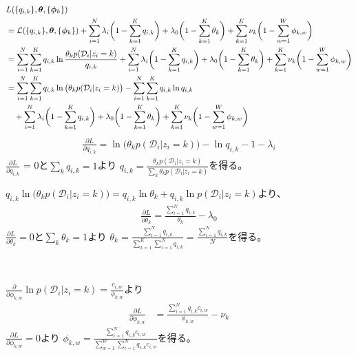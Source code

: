 \documentclass[aspectratio=169,unicode,dvipdfmx,14pt]{beamer}
\begin{document}
\begin{frame}
\FontMath
\begin{align}
& L(\{q_{i,k}\},\bm{\theta}, \{ \bm{\phi}_k \} ) 
\notag \\ &
= \mathcal{L}(\{q_{i,k}\},\bm{\theta},\{ \bm{\phi}_k \})
+ \sum_{i=1}^N \lambda_i \bigg(1 - \sum_{k=1}^K q_{i,k}\bigg)
+ \lambda_0 \bigg( 1 - \sum_{k=1}^K \theta_k \bigg)
+ \sum_{k=1}^K \nu_k \bigg( 1 - \sum_{w=1}^W \phi_{k,w} \bigg)
\notag \\ &
= \sum_{i=1}^N \sum_{k=1}^K q_{i,k} \ln\frac{\theta_k p(\mathcal{D}_i | z_i = k)}{q_{i,k}}
+ \sum_{i=1}^N \lambda_i \bigg(1 - \sum_{k=1}^K q_{i,k}\bigg)
+ \lambda_0 \bigg( 1 - \sum_{k=1}^K \theta_k \bigg)
+ \sum_{k=1}^K \nu_k \bigg( 1 - \sum_{w=1}^W \phi_{k,w} \bigg)
\notag \\ &
= 
\sum_{i=1}^N \sum_{k=1}^K q_{i,k} \ln \big( \theta_k p(\mathcal{D}_i | z_i = k) \big)
- \sum_{i=1}^N \sum_{k=1}^K q_{i,k} \ln q_{i,k}
\notag \\ & \mbox{ \ \ }
+ \sum_{i=1}^N \lambda_i \bigg(1 - \sum_{k=1}^K q_{i,k}\bigg)
+ \lambda_0 \bigg( 1 - \sum_{k=1}^K \theta_k \bigg)
+ \sum_{k=1}^K \nu_k \bigg( 1 - \sum_{w=1}^W \phi_{k,w} \bigg)
\end{align}
\begin{align}
\frac{\partial L}{\partial q_{i,k}}
= \ln \big( \theta_k p(\mathcal{D}_i | z_i = k) \big) - \ln q_{i,k} - 1 - \lambda_i
\end{align}
$\frac{\partial L}{\partial q_{i,k}}$ = 0と$\sum_k q_{i,k}=1$より
$q_{i,k} = \frac{ \theta_k p(\mathcal{D}_i | z_i = k) }{ \sum_k \theta_k p(\mathcal{D}_i | z_i = k) }$を得る。
\end{frame}

\begin{frame}
\FontMath
$q_{i,k} \ln \big( \theta_k p(\mathcal{D}_i | z_i = k) \big)
= q_{i,k} \ln \theta_k + q_{i,k} \ln p(\mathcal{D}_i | z_i = k)$より、
\begin{align}
\frac{\partial L}{\partial \theta_k}
= \frac{ \sum_{i=1}^N  q_{i,k} }{ \theta_k } - \lambda_0
\end{align}
$\frac{\partial L}{\partial \theta_k} = 0$と$\sum_k \theta_k = 1$より
$\theta_k = \frac{ \sum_{i=1}^N q_{i,k} }{ \sum_{k=1}^K \sum_{i=1}^N q_{i,k} } = \frac{ \sum_{i=1}^N q_{i,k} }{ N }$を得る。

\

$\frac{\partial }{\partial \phi_{k,w}} \ln p(\mathcal{D}_i | z_i = k) = \frac{ c_{i,w} }{ \phi_{k,w} }$より
\begin{align}
\frac{\partial L}{\partial \phi_{k,w}}
& = \frac{ \sum_{i=1}^N q_{i,k} c_{i,w} }{ \phi_{k,w} } - \nu_k
\end{align}
$\frac{\partial L}{\partial \phi_{k,w}} = 0$より
$\phi_{k,w} = \frac{ \sum_{i=1}^N q_{i,k} c_{i,w} }{ \sum_{w=1}^W \sum_{i=1}^N q_{i,k} c_{i,w} }$を得る。
\end{frame}
\end{document}
